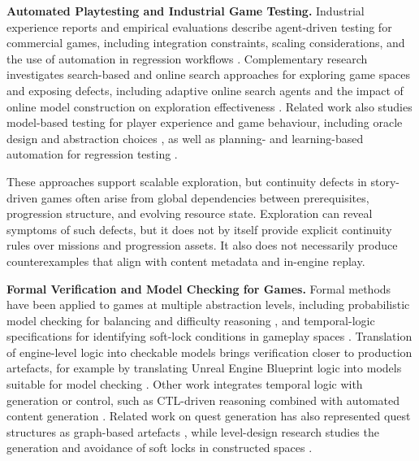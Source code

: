 \documentclass[conference]{IEEEtran}
\begin{document}
\noindent\textbf{Automated Playtesting and Industrial Game Testing.}
Industrial experience reports and empirical evaluations describe
agent-driven testing for commercial games, including integration
constraints, scaling considerations, and the use of automation in
regression workflows
\cite{DBLP:conf/chiplay/PfauSM17,Shirzadeh2022Experience,Latos2022PlaytestingThesis,Politowski2024AgentBasedIndustry,Tufano2022LoadTestingRL,Albaghajati2023Assessment,Politowski2021SurveyVGT,Politowski2022StillLongWay,Becares2017AutomatedBetaTesting,Ariyurek2021SyntheticHumanlikeAgents,Coppola2024KnowYourBugs}.
Complementary research investigates search-based and online search
approaches for exploring game spaces and exposing defects, including
adaptive online search agents and the impact of online model
construction on exploration effectiveness
\cite{Shirzadeh2025OnlineSearch,Coppola2024OnlineSearchStudy,Ferdous2021SearchBasedPlayTesting,Li2022GBGallery}.
Related work also studies model-based testing for player experience and
game behaviour, including oracle design and abstraction choices
\cite{Ansari2023EmotionPattern,Ansari2024PXMBT,Prasetya2025MBTGames,Iftikhar2015MBTPlatformGames},
as well as planning- and learning-based automation for regression
testing \cite{Bloem2024PlanningLearning,Prasetya2020Aplib,Feldt2023LLMTestingAgents}.

These approaches support scalable exploration, but continuity defects in
story-driven games often arise from global dependencies between
prerequisites, progression structure, and evolving resource state.
Exploration can reveal symptoms of such defects, but it does not by
itself provide explicit continuity rules over missions and progression
assets. It also does not necessarily produce counterexamples that align
with content metadata and in-engine replay.

\noindent\textbf{Formal Verification and Model Checking for Games.}
Formal methods have been applied to games at multiple abstraction
levels, including probabilistic model checking for balancing and
difficulty reasoning
\cite{Kavanagh2021PMCgames,MorenoGer2009ModelCheckingAdventure}, and
temporal-logic specifications for identifying soft-lock conditions in
gameplay spaces
\cite{Mawhorter2021SoftlockSM,Thompson2015IntervalTemporalLogicStories}.
Translation of engine-level logic into checkable models brings
verification closer to production artefacts, for example by translating
Unreal Engine Blueprint logic into models suitable for model checking
\cite{Wayama2022BlueprintMC,CardonaRivera2020GFI}. Other work integrates temporal logic with generation or control, such as
CTL-driven reasoning combined with automated content generation
\cite{Aruta2025FindMeCTL}. Related work on quest generation has also
represented quest structures as graph-based artefacts
\cite{Kybartas2014ReGEN}, while level-design research studies the
generation and avoidance of soft locks in constructed spaces
\cite{Cooper2025Softlocks}.
\end{document}

